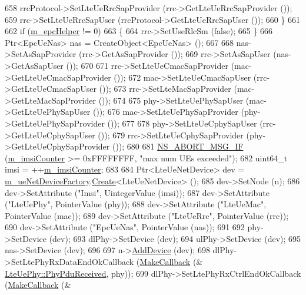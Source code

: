 \begin{DoxyCode}
658       rrcProtocol->SetLteUeRrcSapProvider (rrc->GetLteUeRrcSapProvider ());
659       rrc->SetLteUeRrcSapUser (rrcProtocol->GetLteUeRrcSapUser ());
660     \}
661 
662   \textcolor{keywordflow}{if} (\hyperlink{classns3_1_1LteHelper_aeec42671d76d5bd719b37d77bfd27633}{m\_epcHelper} != 0)
663     \{
664       rrc->SetUseRlcSm (\textcolor{keyword}{false});
665     \}
666   Ptr<EpcUeNas> nas = CreateObject<EpcUeNas> ();
667  
668   nas->SetAsSapProvider (rrc->GetAsSapProvider ());
669   rrc->SetAsSapUser (nas->GetAsSapUser ());
670 
671   rrc->SetLteUeCmacSapProvider (mac->GetLteUeCmacSapProvider ());
672   mac->SetLteUeCmacSapUser (rrc->GetLteUeCmacSapUser ());
673   rrc->SetLteMacSapProvider (mac->GetLteMacSapProvider ());
674 
675   phy->SetLteUePhySapUser (mac->GetLteUePhySapUser ());
676   mac->SetLteUePhySapProvider (phy->GetLteUePhySapProvider ());
677 
678   phy->SetLteUeCphySapUser (rrc->GetLteUeCphySapUser ());
679   rrc->SetLteUeCphySapProvider (phy->GetLteUeCphySapProvider ());
680 
681   \hyperlink{group__fatal_ga6653324225bc139e46deea177614ceee}{NS\_ABORT\_MSG\_IF} (\hyperlink{classns3_1_1LteHelper_acd9bb1a78fa9f3648ec5eb17ad07029c}{m\_imsiCounter} >= 0xFFFFFFFF, \textcolor{stringliteral}{"max num UEs exceeded"});
682   uint64\_t imsi = ++\hyperlink{classns3_1_1LteHelper_acd9bb1a78fa9f3648ec5eb17ad07029c}{m\_imsiCounter};
683 
684   Ptr<LteUeNetDevice> dev = \hyperlink{classns3_1_1LteHelper_acf4f709448cbc362c35b965782d00464}{m\_ueNetDeviceFactory}.\hyperlink{classns3_1_1ObjectFactory_a18152e93f0a6fe184ed7300cb31e9896}{Create}<LteUeNetDevice> ();
685   dev->SetNode (n);
686   dev->SetAttribute (\textcolor{stringliteral}{"Imsi"}, UintegerValue (imsi));
687   dev->SetAttribute (\textcolor{stringliteral}{"LteUePhy"}, PointerValue (phy));
688   dev->SetAttribute (\textcolor{stringliteral}{"LteUeMac"}, PointerValue (mac));
689   dev->SetAttribute (\textcolor{stringliteral}{"LteUeRrc"}, PointerValue (rrc));
690   dev->SetAttribute (\textcolor{stringliteral}{"EpcUeNas"}, PointerValue (nas));
691 
692   phy->SetDevice (dev);
693   dlPhy->SetDevice (dev);
694   ulPhy->SetDevice (dev);
695   nas->SetDevice (dev);
696 
697   n->\hyperlink{classns3_1_1Node_a42ff83ee1d5d1649c770d3f5b62375de}{AddDevice} (dev);
698   dlPhy->SetLtePhyRxDataEndOkCallback (\hyperlink{group__makecallbackmemptr_ga9376283685aa99d204048d6a4b7610a4}{MakeCallback} (&
      \hyperlink{classns3_1_1LteUePhy_ac78ec37217590a6cec1e0ca89f7014f9}{LteUePhy::PhyPduReceived}, phy));
699   dlPhy->SetLtePhyRxCtrlEndOkCallback (\hyperlink{group__makecallbackmemptr_ga9376283685aa99d204048d6a4b7610a4}{MakeCallback} (&

\end{DoxyCode}
